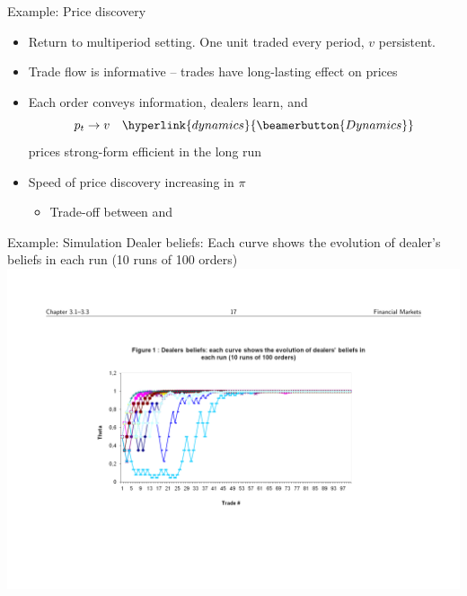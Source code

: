 \documentclass[english,10pt
,aspectratio=169
]{beamer}
\begin{document}


\begin{frame}[label=example]{Example: Price discovery}
\begin{itemize}
	\item Return to multiperiod setting. One unit traded every period, $v$ persistent.
	\item Trade flow is \alert{informative} -- trades have long-lasting effect on prices
	\item Each order conveys information, dealers learn, and 
	$$p_t \rightarrow v \quad
	\hyperlink{dynamics}{\beamerbutton{Dynamics}} $$
	prices \alert{strong-form efficient} in the long run
	\pause
	\item Speed of price discovery increasing in $\pi$
	\begin{itemize}
		\item Trade-off between  and 
	\end{itemize}
\end{itemize}
\end{frame}


\begin{frame}{Example: Simulation}
	Dealer beliefs: Each curve shows the evolution of dealer's beliefs in each run (10 runs of 100 orders)
	\quad
	\center
	\includegraphics[width=0.95\linewidth]{pics/DealerBeliefs_Image.pdf}
\end{frame}
\end{document}
